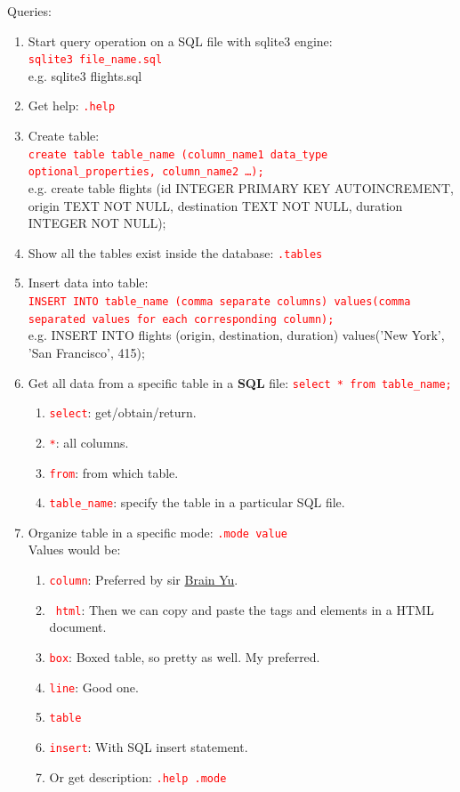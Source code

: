 \documentclass[12 pt, letterpaper]{extarticle}
\newcommand{\R}{\textcolor{red}} %
\newcommand{\T}{\texttt}
\begin{document}
	\pagebreak
	Queries:
	\begin{enumerate}
		\item Start query operation on a SQL file with sqlite3 engine:\\
			\R{\T{sqlite3 file\_name.sql}}\\
			e.g. \textcolor{red!70}{sqlite3 flights.sql}
		\item Get help: \R{\T{.help}}
		\item Create table: \\
			\R{\T{create table table\_name (column\_name1 data\_type optional\_properties, column\_name2 \dots);}}\\
			e.g. \textcolor{red!70}{create table flights (id INTEGER PRIMARY KEY AUTOINCREMENT, origin TEXT NOT NULL, destination TEXT NOT NULL, duration INTEGER NOT NULL);}
		\item Show all the tables exist inside the database: \R{\T{.tables}}
		\item Insert data into table:\\
			\R{\T{INSERT INTO table\_name (comma separate columns) values(comma separated values for each corresponding column);}}\\
			e.g. \textcolor{red!70}{INSERT INTO flights (origin, destination, duration) values('New York', 'San Francisco', 415);}
		
		\item Get all data from a specific table in a \textbf{SQL} file: \R{\T{select * from table\_name;}}
			\begin{enumerate}
				\item \R{\T{select}}: get/obtain/return.
				\item \R{\T{*}}: all columns.
				\item \R{\T{from}}: from which table.
				\item \R{\T{table\_name}}: specify the table in a particular SQL file.
			\end{enumerate}
			
		\item Organize table in a specific mode: \R{\T{.mode value}}\\
		Values would be:
		\begin{enumerate}
			\item \R{\T{column}}:  Preferred by sir \href{https://brianyu.me/}{Brain Yu}.
			\item \R{\T{ html}}: Then we can copy and paste the tags and elements in a HTML document.
			\item \R{\T{box}}: Boxed table, so pretty as well. My preferred.
			\item \R{\T{line}}:  Good one.
			\item \R{\T{table}}
			\item \R{\T{insert}}: With SQL insert statement.
			\item Or get description: \R{\T{.help .mode}}
		\end{enumerate}
		

\end{enumerate}
\end{document}
